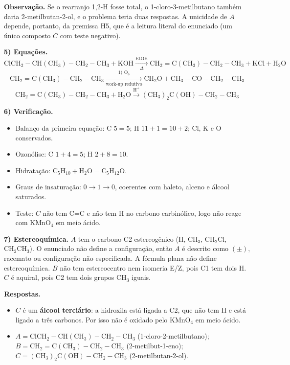 \documentclass{article}%
\begin{document}
\textbf{Observação.} Se o rearranjo 1,2-H fosse total, o 1-cloro-3-metilbutano também daria 2-metilbutan-2-ol, e o problema teria duas respostas. A unicidade de $A$ depende, portanto, da premissa H5, que é a leitura literal do enunciado (um único composto $C$ com teste negativo).

\textbf{5) Equações.}
\[
\mathrm{ClCH_2-CH(CH_3)-CH_2-CH_3}+\mathrm{KOH}\xrightarrow[\Delta]{\mathrm{EtOH}}\mathrm{CH_2=C(CH_3)-CH_2-CH_3}+\mathrm{KCl}+\mathrm{H_2O}
\]
\[
\mathrm{CH_2=C(CH_3)-CH_2-CH_3}\xrightarrow[\text{work-up redutivo}]{\text{1) }\mathrm{O_3}}\mathrm{CH_2O}+\mathrm{CH_3-CO-CH_2-CH_3}
\]
\[
\mathrm{CH_2=C(CH_3)-CH_2-CH_3}+\mathrm{H_2O}\xrightarrow{\mathrm{H^+}}\mathrm{(CH_3)_2C(OH)-CH_2-CH_3}
\]

\textbf{6) Verificação.}
\begin{itemize}
\item Balanço da primeira equação: C $5=5$; H $11+1=10+2$; Cl, K e O conservados.
\item Ozonólise: C $1+4=5$; H $2+8=10$.
\item Hidratação: $\mathrm{C_5H_{10}}+\mathrm{H_2O}=\mathrm{C_5H_{12}O}$.
\item Graus de insaturação: $0\rightarrow 1\rightarrow 0$, coerentes com haleto, alceno e álcool saturados.
\item Teste: $C$ não tem C=C e não tem H no carbono carbinólico, logo não reage com $\mathrm{KMnO_4}$ em meio ácido.
\end{itemize}

\textbf{7) Estereoquímica.} $A$ tem o carbono C2 estereogênico (H, $\mathrm{CH_3}$, $\mathrm{CH_2Cl}$, $\mathrm{CH_2CH_3}$). O enunciado não define a configuração, então $A$ é descrito como $(\pm)$, racemato ou configuração não especificada. A fórmula plana não define estereoquímica. $B$ não tem estereocentro nem isomeria E/Z, pois C1 tem dois H. $C$ é aquiral, pois C2 tem dois grupos $\mathrm{CH_3}$ iguais.

\textbf{Respostas.}
\begin{itemize}
\item[a)] $C$ é um \textbf{álcool terciário}: a hidroxila está ligada a C2, que não tem H e está ligado a três carbonos. Por isso não é oxidado pelo $\mathrm{KMnO_4}$ em meio ácido.
\item[b)] $A=\mathrm{ClCH_2-CH(CH_3)-CH_2-CH_3}$ (1-cloro-2-metilbutano); $B=\mathrm{CH_2=C(CH_3)-CH_2-CH_3}$ (2-metilbut-1-eno); $C=\mathrm{(CH_3)_2C(OH)-CH_2-CH_3}$ (2-metilbutan-2-ol).
\end{itemize}
\end{document}

